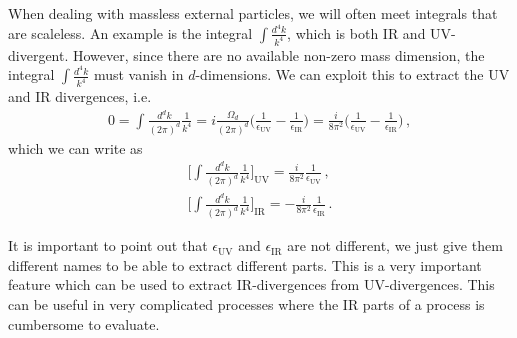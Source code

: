When dealing with massless external particles, we will often meet integrals that are scaleless. An example is the integral $\int\frac{d^{4}k}{k^{4}}$, which is both IR and UV-divergent. However, since there are no available non-zero mass dimension, the integral $\int\frac{d^{4}k}{k^{4}}$ must vanish in $d$-dimensions. We can exploit this to extract the UV and IR divergences, i.e.
\begin{align}\label{eq:scaleless integral}
    0=\int\frac{d^{d}k}{(2\pi)^{d}}\frac{1}{k^{4}}=i\frac{\Omega_{d}}{(2\pi)^{d}}\Big(\frac{1}{\epsilon_{\text{UV}}}-\frac{1}{\epsilon_{\text{IR}}}\Big)=\frac{i}{8\pi^{2}}\Big(\frac{1}{\epsilon_{\text{UV}}}-\frac{1}{\epsilon_{\text{IR}}}\Big)\,,
\end{align}
which we can write as
\begin{align}
    \Big[\int\frac{d^{d}k}{(2\pi)^{d}}\frac{1}{k^{4}}\Big]_{\text{UV}}=\frac{i}{8\pi^{2}}\frac{1}{\epsilon_{\text{UV}}}\,,
    \\
    \Big[\int\frac{d^{d}k}{(2\pi)^{d}}\frac{1}{k^{4}}\Big]_{\text{IR}}=-\frac{i}{8\pi^{2}}\frac{1}{\epsilon_{\text{IR}}}\,.
\end{align}

It is important to point out that $\epsilon_{\text{UV}}$ and $\epsilon_{\text{IR}}$ are not different, we just give them different names to be able to extract different parts.
This is a very important feature which can be used to extract IR-divergences from UV-divergences. This can be useful in very complicated processes where the IR parts of a process is cumbersome to evaluate. 


